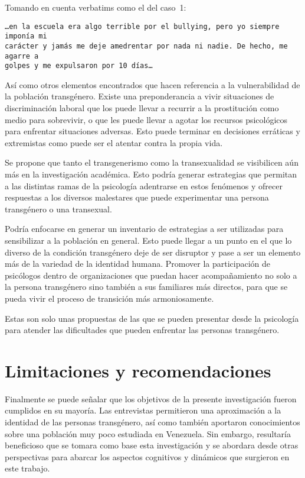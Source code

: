Tomando en cuenta verbatims como el del caso~1:

\begin{verbatim}
…en la escuela era algo terrible por el bullying, pero yo siempre imponía mi
carácter y jamás me deje amedrentar por nada ni nadie. De hecho, me agarre a
golpes y me expulsaron por 10 días…
\end{verbatim}

Así como otros elementos encontrados que hacen referencia a la vulnerabilidad de
la población transgénero. Existe una preponderancia a vivir situaciones de
discriminación laboral que los puede llevar a recurrir a la prostitución como
medio para sobrevivir, o que les puede llevar a agotar los recursos psicológicos
para enfrentar situaciones adversas. Esto puede terminar en decisiones erráticas
y extremistas como puede ser el atentar contra la propia vida.

Se propone que tanto el transgenerismo como la transexualidad se
visibilicen aún más en la investigación académica. Esto podría
generar estrategias que permitan a las distintas ramas de la
psicología adentrarse en estos fenómenos y ofrecer respuestas a
los diversos malestares que puede experimentar una persona
transgénero o una transexual.

Podría enfocarse en generar un inventario de estrategias a ser utilizadas para
sensibilizar a la población en general. Esto puede llegar a un punto en el que
lo diverso de la condición transgénero deje de ser disruptor y pase a ser un
elemento más de la variedad de la identidad humana. Promover la participación de
psicólogos dentro de organizaciones que puedan hacer acompañamiento no solo a la
persona transgénero sino también a sus familiares más directos, para que se
pueda vivir el proceso de transición más armoniosamente.

Estas son solo unas propuestas de las que se pueden presentar desde la
psicología para atender las dificultades que pueden enfrentar
las personas transgénero.

\section{Limitaciones y recomendaciones}

Finalmente se puede señalar que los objetivos de la presente investigación
fueron cumplidos en su mayoría. Las entrevistas permitieron una aproximación a
la identidad de las personas transgénero, así como también aportaron
conocimientos sobre una población muy poco estudiada en Venezuela. Sin embargo,
resultaría beneficioso que se tomara como base esta investigación y se abordara
desde otras perspectivas para abarcar los aspectos cognitivos y dinámicos que
surgieron en este trabajo.

